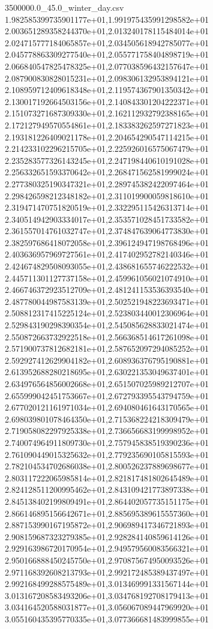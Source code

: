 \begin{filecontents*}{3500000.0_45.0_winter_day.csv}
1.982585399735901177e+01,1.991975435991298582e+01
2.003651289358244370e+01,2.013240178115484014e+01
2.024715777184065857e+01,2.034505618942785077e+01
2.045778863309277540e+01,2.055771758404898719e+01
2.066840547825478325e+01,2.077038596432157647e+01
2.087900830828015231e+01,2.098306132953894121e+01
2.108959712409618348e+01,2.119574367901350342e+01
2.130017192664503156e+01,2.140843301204222371e+01
2.151073271687309330e+01,2.162112932792388165e+01
2.172127949570554861e+01,2.183383262597271823e+01
2.193181226409021178e+01,2.204654290547114215e+01
2.214233102296215705e+01,2.225926016575067479e+01
2.235283577326143245e+01,2.247198440610191028e+01
2.256332651593370642e+01,2.268471562581999024e+01
2.277380325190347321e+01,2.289745382422097464e+01
2.298426598212348182e+01,2.311019900059818610e+01
2.319471470751820519e+01,2.332295115426313714e+01
2.340514942903334017e+01,2.353571028451733582e+01
2.361557014761032747e+01,2.374847639064773830e+01
2.382597686418072058e+01,2.396124947198768496e+01
2.403636957969727561e+01,2.417402952782140346e+01
2.424674829508093055e+01,2.438681655746222532e+01
2.445711301127737158e+01,2.459961056021074910e+01
2.466746372923512709e+01,2.481241153536393540e+01
2.487780044987583139e+01,2.502521948223693471e+01
2.508812317415225124e+01,2.523803440012306964e+01
2.529843190298390354e+01,2.545085628833021474e+01
2.550872663732922518e+01,2.566368514617261098e+01
2.571900737812682181e+01,2.587652097294085252e+01
2.592927412629904182e+01,2.608936376795190881e+01
2.613952688280218695e+01,2.630221353049637401e+01
2.634976564856002668e+01,2.651507025989212707e+01
2.655999042451753667e+01,2.672793395543794759e+01
2.677020121161971034e+01,2.694080461643170565e+01
2.698039801078464350e+01,2.715368224218309479e+01
2.719058082297925338e+01,2.736656683199998952e+01
2.740074964911809730e+01,2.757945838519390236e+01
2.761090449015325632e+01,2.779235690105815593e+01
2.782104534702686038e+01,2.800526237889698677e+01
2.803117222065985814e+01,2.821817481802645489e+01
2.824128511200995462e+01,2.843109421773897338e+01
2.845138402199809491e+01,2.864402057735151175e+01
2.866146895156642671e+01,2.885695389615557360e+01
2.887153990167195872e+01,2.906989417346721893e+01
2.908159687323279385e+01,2.928284140859614126e+01
2.929163986720170954e+01,2.949579560083566321e+01
2.950166888450245750e+01,2.970875674950093526e+01
2.971168392608213793e+01,2.992172485389437497e+01
2.992168499288575489e+01,3.013469991331567144e+01
3.013167208583493206e+01,3.034768192708179413e+01
3.034164520588031877e+01,3.056067089447969920e+01
3.055160435395770335e+01,3.077366681483999855e+01

\end{filecontents*}
